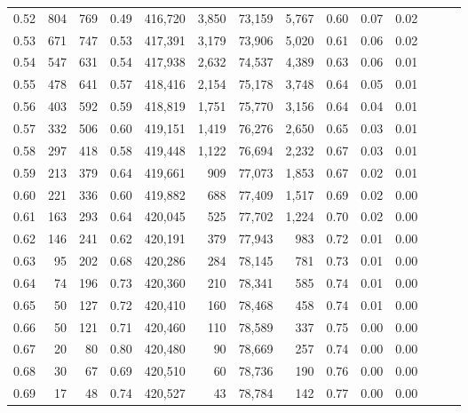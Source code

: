 \begin{tabular}{rrrrrrrrrrrrrr}
0.52 &     804 &    769 &  0.49 &  416,720 &    3,850 &  73,159 &   5,767 &  0.60 &  0.07 &      0.02 \\
0.53 &     671 &    747 &  0.53 &  417,391 &    3,179 &  73,906 &   5,020 &  0.61 &  0.06 &      0.02 \\
0.54 &     547 &    631 &  0.54 &  417,938 &    2,632 &  74,537 &   4,389 &  0.63 &  0.06 &      0.01 \\
0.55 &     478 &    641 &  0.57 &  418,416 &    2,154 &  75,178 &   3,748 &  0.64 &  0.05 &      0.01 \\
0.56 &     403 &    592 &  0.59 &  418,819 &    1,751 &  75,770 &   3,156 &  0.64 &  0.04 &      0.01 \\
0.57 &     332 &    506 &  0.60 &  419,151 &    1,419 &  76,276 &   2,650 &  0.65 &  0.03 &      0.01 \\
0.58 &     297 &    418 &  0.58 &  419,448 &    1,122 &  76,694 &   2,232 &  0.67 &  0.03 &      0.01 \\
0.59 &     213 &    379 &  0.64 &  419,661 &      909 &  77,073 &   1,853 &  0.67 &  0.02 &      0.01 \\
0.60 &     221 &    336 &  0.60 &  419,882 &      688 &  77,409 &   1,517 &  0.69 &  0.02 &      0.00 \\
0.61 &     163 &    293 &  0.64 &  420,045 &      525 &  77,702 &   1,224 &  0.70 &  0.02 &      0.00 \\
0.62 &     146 &    241 &  0.62 &  420,191 &      379 &  77,943 &     983 &  0.72 &  0.01 &      0.00 \\
0.63 &      95 &    202 &  0.68 &  420,286 &      284 &  78,145 &     781 &  0.73 &  0.01 &      0.00 \\
0.64 &      74 &    196 &  0.73 &  420,360 &      210 &  78,341 &     585 &  0.74 &  0.01 &      0.00 \\
0.65 &      50 &    127 &  0.72 &  420,410 &      160 &  78,468 &     458 &  0.74 &  0.01 &      0.00 \\
0.66 &      50 &    121 &  0.71 &  420,460 &      110 &  78,589 &     337 &  0.75 &  0.00 &      0.00 \\
0.67 &      20 &     80 &  0.80 &  420,480 &       90 &  78,669 &     257 &  0.74 &  0.00 &      0.00 \\
0.68 &      30 &     67 &  0.69 &  420,510 &       60 &  78,736 &     190 &  0.76 &  0.00 &      0.00 \\
0.69 &      17 &     48 &  0.74 &  420,527 &       43 &  78,784 &     142 &  0.77 &  0.00 &      0.00 \\

\end{tabular}
